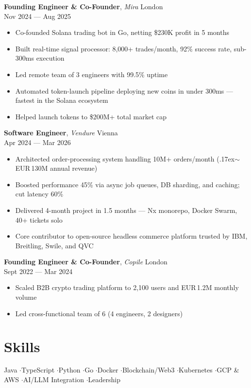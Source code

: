 \documentclass[a4paper,10pt]{article}
\newcommand{\entry}[4]{%
  \textbf{#1}, \textit{#2} \hfill #3 \\ \vspace{-2pt}
  {\small #4}%
}
\begin{document}
\vspace{4pt}
\entry{Founding Engineer \& Co-Founder}{Mira}{London}{Nov 2024 --- Aug 2025}
\begin{itemize}
  \item Co-founded Solana trading bot in Go, netting \$230K profit in 5 months
  \item Built real-time signal processor: 8,000+ trades/month, 92\% success rate, sub-300ms execution
  \item Led remote team of 3 engineers with 99.5\% uptime
  \item Automated token-launch pipeline deploying new coins in under 300ms --- fastest in the Solana ecosystem
  \item Helped launch tokens to \$200M+ total market cap
\end{itemize}

\vspace{4pt}
\entry{Software Engineer}{Vendure}{Vienna}{Apr 2024 --- Mar 2026}
\begin{itemize}
  \item Architected order-processing system handling 10M+ orders/month ({\raise.17ex\hbox{$\scriptstyle\sim$}}EUR\,130M annual revenue)
  \item Boosted performance 45\% via async job queues, DB sharding, and caching; cut latency 60\%
  \item Delivered 4-month project in 1.5 months --- Nx monorepo, Docker Swarm, 40+ tickets solo
  \item Core contributor to open-source headless commerce platform trusted by IBM, Breitling, Swile, and QVC
\end{itemize}

\vspace{4pt}
\entry{Founding Engineer \& Co-Founder}{Copile}{London}{Sept 2022 --- Mar 2024}
\begin{itemize}
  \item Scaled B2B crypto trading platform to 2,100 users and EUR\,1.2M monthly volume
  \item Led cross-functional team of 6 (4 engineers, 2 designers)
\end{itemize}

\section{Skills}
Java \enspace$\cdot$\enspace TypeScript \enspace$\cdot$\enspace Python \enspace$\cdot$\enspace Go \enspace$\cdot$\enspace Docker \enspace$\cdot$\enspace Blockchain/Web3 \enspace$\cdot$\enspace Kubernetes \enspace$\cdot$\enspace GCP \& AWS \enspace$\cdot$\enspace AI/LLM Integration \enspace$\cdot$\enspace Leadership
\end{document}
